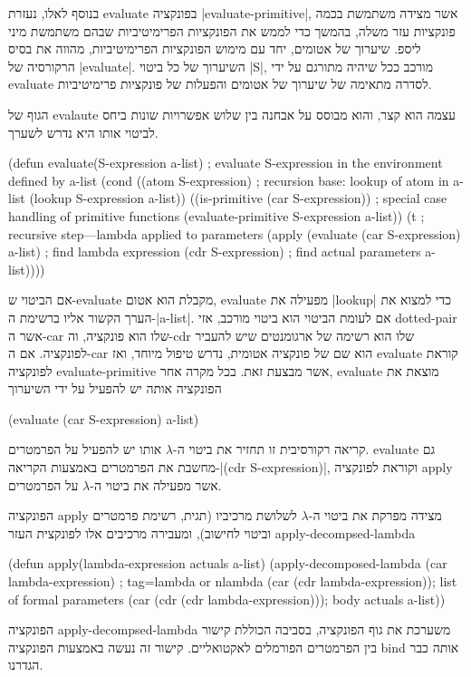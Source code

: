 בנוסף לאלו, נעזרת evaluate בפונקציה \E|evaluate-primitive|, אשר מצידה משתמשת
בכמה פונקציות עזר משלה, בהמשך כדי לממש את הפונקציות הפרימיטיביות שבהם משתמשת
מיני ליספ. שיערוך של אטומים, יחד עם מימוש הפונקציות הפרימיטיביות, מהווה את
בסיס הרקורסיה של \E|evaluate|. השיערוך של כל ביטוי \E|S|, מורכב ככל שיהיה
מתורגם על ידי evaluate לסדרה מתאימה של שיערוך של אטומים והפעלות של פונקציות
פרימיטיביות.

הגוף של evalaute עצמה הוא קצר, והוא מבוסס על אבחנה בין שלוש אפשרויות שונות ביחס
לביטוי אותו היא נדרש לשערך.

\begin{KERNEL}
(defun evaluate(S-expression a-list) ; evaluate S-expression in the environment defined by a-list
  (cond ((atom S-expression) ; recursion base: lookup of atom in a-list
          (lookup S-expression a-list))
        ((is-primitive (car S-expression)) ; special case handling of primitive functions
          (evaluate-primitive S-expression a-list))
        (t ; recursive step---lambda applied to parameters
          (apply (evaluate (car S-expression) a-list) ; find lambda expression
                  (cdr S-expression) ; find actual parameters
                  a-list))))
\end{KERNEL}

אם הביטוי ש-evaluate מקבלת הוא אטום, evaluate מפעילה את \E|lookup| כדי למצוא את
הערך הקשור אליו ברשימת ה-\E|a-list|. אם לעומת הביטוי הוא ביטוי מורכב, אזי
dotted-pair אשר ה-car שלו הוא פונקציה, וה-cdr שלו הוא רשימה של
ארגומנטים שיש להעביר לפונקציה. אם ה-car הוא שם של פונקציה אטומית, נדרש טיפול
מיוחד, ואז evaluate קוראת לפונקציה evaluate-primitive אשר מבצעת זאת.
בכל מקרה אחר, evaluate מוצאת את הפונקציה אותה יש להפעיל על ידי השיערוך
\begin{LISP}
(evaluate (car S-expression) a-list)
\end{LISP}
קריאה רקורסיבית זו תחזיר את ביטוי ה-$λ$ אותו יש להפעיל על הפרמטרים. evaluate
גם מחשבת את הפרמטרים באמצעות הקריאה-\T|(cdr S-expression)|, וקוראת לפונקציה
apply אשר מפעילה את ביטוי ה-$λ$ על הפרמטרים.

הפונקציה apply מצידה מפרקת את ביטוי ה-$λ$ לשלושת מרכיביו (תגית, רשימת פרמטרים
וביטוי לחישוב), ומעבירה מרכיבים אלו לפונקצית העזר apply-decompsed-lambda
\begin{KERNEL}
(defun apply(lambda-expression actuals a-list)
  (apply-decomposed-lambda
    (car lambda-expression) ; tag=lambda or nlambda
    (car (cdr lambda-expression)); list of formal parameters
    (car (cdr (cdr lambda-expression))); body
    actuals
    a-list))
\end{KERNEL}
הפונקציה apply-decompsed-lambda משערכת את גוף הפונקציה, בסביבה הכוללת קישור בין
הפרמטרים הפורמלים לאקטואליים. קישור זה נעשה באמצעות הפונקציה bind אותה כבר
הגדרנו.

